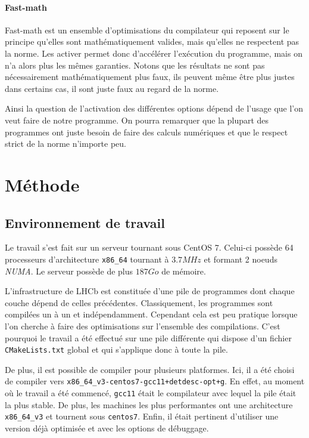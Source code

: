 \documentclass[a4paper]{report}
\begin{document}
\subsubsection{Fast-math}

Fast-math est un ensemble d'optimisations du compilateur qui reposent sur le principe qu'elles sont mathématiquement valides, mais qu'elles ne respectent pas la norme.
Les activer permet donc d'accélérer l'exécution du programme, mais on n'a alors plus les mêmes garanties.
Notons que les résultats ne sont pas nécessairement mathématiquement plus faux, ils peuvent même être plus justes dans certains cas, il sont juste faux au regard de la norme.

Ainsi la question de l'activation des différentes options dépend de l'usage que l'on veut faire de notre programme.
On pourra remarquer que la plupart des programmes ont juste besoin de faire des calculs numériques et que le respect strict de la norme n'importe peu.


\chapter{Méthode}
\section{Environnement de travail}
Le travail s'est fait sur un serveur tournant sous CentOS 7.
Celui-ci possède 64 processeurs d'architecture \verb'x86_64' tournant à $3.7 MHz$ et formant 2 noeuds \emph{NUMA}.
Le serveur possède de plus $187 Go$ de mémoire.

L'infrastructure de LHCb est constituée d'une pile de programmes dont chaque couche dépend de celles précédentes.
Classiquement, les programmes sont compilées un à un et indépendamment.
Cependant cela est peu pratique lorsque l'on cherche à faire des optimisations sur l'ensemble des compilations.
C'est pourquoi le travail a été effectué sur une pile différente qui dispose d'un fichier \verb'CMakeLists.txt' global et qui s'applique donc à toute la pile.

De plus, il est possible de compiler pour plusieurs platformes.
Ici, il a été choisi de compiler vers \verb'x86_64_v3-centos7-gcc11+detdesc-opt+g'.
En effet, au moment où le travail a été commencé, \verb'gcc11' était le compilateur avec lequel la pile était la plus stable.
De plus, les machines les plus performantes ont une architecture \verb'x86_64_v3' et tournent sous \verb'centos7'.
Enfin, il était pertinent d'utiliser une version déjà optimisée et avec les options de débuggage.
\end{document}
